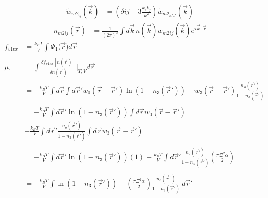 \documentclass[double,12pt]{beavtex}
\begin{document}
\begin{align}
    \widetilde{w}_{m2_{ij}}(\vec{k}) &= (\delta{ij}-3\frac{k_ik_j}{k^2})
                                    \widetilde{w}_{{m2}_{x'x'}}(\vec{k})
\end{align}
\begin{align}
    n_{m2ij}(\vec r) &=  \frac{1}{\left(2\pi\right)^3}\int d\vec k\, 
                       n(\vec k) w_{m2ij}(\vec k)e^{i\vec k\cdot \vec r}
\end{align} 
\begin{align}
    f_{v1ex} &= \frac{k_BT}{V}\int \Phi_1(\vec{r}{) d}\vec{r} \\ \nonumber\\
    \mu_1 &= \int \frac{\delta f_{v1ex}[n(\vec r)]}{\delta n(\vec r)}
    \bigg|_{T,V} d\vec{r} \\
        &= -\frac{k_BT}{V} \int d\vec r \int d \vec r' w_0(\vec r - \vec r')
          \ln(1-n_3(\vec r')) - w_3(\vec r - \vec r')\frac{n_o(\vec r')}
          {1-n_3(\vec r')} \\ \nonumber\\
        &= -\frac{k_BT}{V} \int d\vec r' \ln(1-n_3(\vec r')) \int d \vec r  
          w_0(\vec r - \vec r') \nonumber\\
        &+ \frac{k_BT}{V} \int d\vec r' \frac{n_o(\vec r')}{1-n_3(\vec r')} 
          \int d \vec r  w_3(\vec r - \vec r')  \\ \\
        &= -\frac{k_BT}{V} \int d\vec r' \ln(1-n_3(\vec r'))(1)
          + \frac{k_BT}{V} \int d\vec r' \frac{n_o(\vec r')}{1-n_3(\vec r')}
          \left(\frac{\pi\Xi^2\alpha}{2}\right) \\ \\
        &= -\frac{k_BT}{V}\int\ln(1-n_3(\vec r'))-\left(
        \frac{\pi\Xi^2\alpha}{2}\right)\frac{n_o(\vec r')}{1-n_3(\vec r')}~d\vec r'
\end{align}
\end{document}
